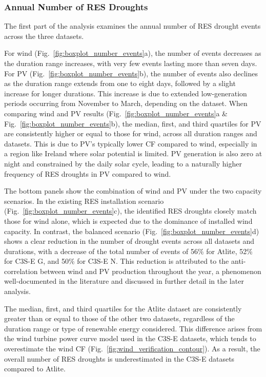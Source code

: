 \documentclass[a4paper, 11pt]{article}
\begin{document}
\subsubsection{Annual Number of RES Droughts}

The first part of the analysis examines the annual number of RES drought events across the three datasets. 

For wind (Fig.~\ref{fig:boxplot_number_events}a), the number of events decreases as the duration range increases, with very few events lasting more than seven days. For PV (Fig.~\ref{fig:boxplot_number_events}b), the number of events also declines as the duration range extends from one to eight days, followed by a slight increase for longer durations. This increase is due to extended low-generation periods occurring from November to March, depending on the dataset. When comparing wind and PV results (Fig.~\ref{fig:boxplot_number_events}a \& Fig.~\ref{fig:boxplot_number_events}b), the median, first, and third quartiles for PV are consistently higher or equal to those for wind, across all duration ranges and datasets. This is due to PV's typically lower CF compared to wind, especially in a region like Ireland where solar potential is limited. PV generation is also zero at night and constrained by the daily solar cycle, leading to a naturally higher frequency of RES droughts in PV compared to wind.

The bottom panels show the combination of wind and PV under the  two capacity scenarios. In the existing RES installation scenario (Fig.~\ref{fig:boxplot_number_events}c), the identified RES droughts closely match those for wind alone, which is expected due to the dominance of installed wind capacity. In contrast, the balanced scenario (Fig.~\ref{fig:boxplot_number_events}d) shows a clear reduction in the number of drought events across all datasets and durations, with a decrease of the total number of events of 56\% for Atlite, 52\% for C3S-E G, and 50\% for C3S-E N. This reduction is attributed to the anti-correlation between wind and PV production throughout the year, a phenomenon well-documented in the literature \cite{kaspar2019drought} and discussed in further detail in the later analysis.

The median, first, and third quartiles for the Atlite dataset are consistently greater than or equal to those of the other two datasets, regardless of the duration range or type of renewable energy considered. This difference arises from the wind turbine power curve model used in the C3S-E datasets, which tends to overestimate the wind CF (Fig.~\ref{fig:wind_verification_contour}). As a result, the overall number of RES droughts is underestimated in the C3S-E datasets compared to Atlite. 
\end{document}
